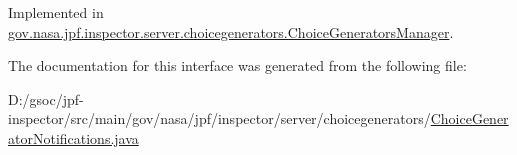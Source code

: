 Implemented in \hyperlink{classgov_1_1nasa_1_1jpf_1_1inspector_1_1server_1_1choicegenerators_1_1_choice_generators_manager_a86e3ebd46655f4356b9b81287bf53600}{gov.\+nasa.\+jpf.\+inspector.\+server.\+choicegenerators.\+Choice\+Generators\+Manager}.



The documentation for this interface was generated from the following file\+:\begin{DoxyCompactItemize}
\item 
D\+:/gsoc/jpf-\/inspector/src/main/gov/nasa/jpf/inspector/server/choicegenerators/\hyperlink{_choice_generator_notifications_8java}{Choice\+Generator\+Notifications.\+java}\end{DoxyCompactItemize}
